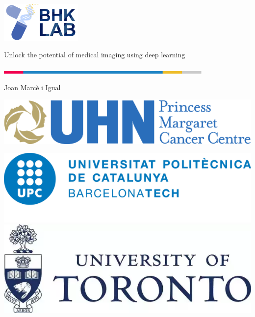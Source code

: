 \documentclass[xcolor={x11names, table, dvipsnames}, compress]{beamer}
\begin{document}
{
    \begin{frame}
        \begin{flushright}
            \hfill\includegraphics[width=0.3\textwidth]{images_presentation/logo}
        \end{flushright}
        \begin{flushleft}
            \begin{flushleft}
                \huge \color{BHKpresentationDark} 
                Unlock the potential of medical imaging using deep learning 
            \end{flushleft}

            \hspace{-1cm}\includegraphics[width=0.8\textwidth]{images_presentation/title_line}\hfill
            
            \date{$~~$}
            \vspace{-1cm}
            {\begin{flushleft}\vspace{-1cm} Joan Marcè i Igual\end{flushleft}}
            \titlepage
        \end{flushleft}
        
        \begin{flushright}
            \vspace{-3cm}
            \includegraphics[width=.35\textwidth]{images_presentation/pmcp-logo} 

            \vspace{0.5cm}
            \includegraphics[width=.35\textwidth]{images_presentation/upc-logo} \hspace{1cm}
            \includegraphics[width=.35\textwidth]{images_presentation/uoft-logo}
        \end{flushright}
    \end{frame}
}
\end{document}
